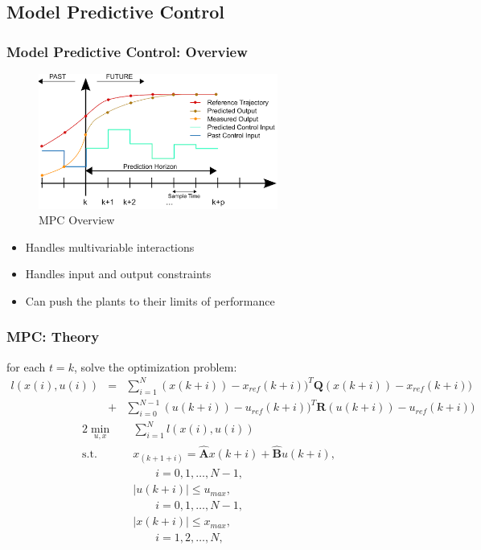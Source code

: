 \documentclass{beamer}
\begin{document}
\subsection{Model Predictive Control}
\begin{frame}
  \frametitle{Model Predictive Control: Overview}
  \begin{figure}
    \includegraphics[width = 0.7\textwidth]{fig/MPC.png}
    \caption{MPC Overview}
  \end{figure}
  \vspace{-0.5cm}
  \begin{itemize}
    \item Handles multivariable interactions
    \item Handles input and output constraints
    \item Can push the plants to their limits of performance
  \end{itemize}
\end{frame}

\begin{frame}
  \frametitle{MPC: Theory}
  for each $t = k$, solve the optimization problem: 
  \small
  \begin{eqnarray}
    l(x(i),u(i)) &=& \sum\limits_{i = 1}^N(x(k+i))-x_{ref}(k+i))^T\mathbf{Q}(x(k+i))-x_{ref}(k+i)) \nonumber \\
    &+&\sum\limits_{i = 0}^{N-1}(u(k+i))-u_{ref}(k+i))^T\mathbf{R}(u(k+i))-u_{ref}(k+i)) \nonumber
\end{eqnarray}
\vspace{-0.5cm}
\begin{alignat}{2}
    \min_{u,x} \quad &\sum\limits_{i=1}^N l(x(i),u(i)) \\
    \mbox{s.t.}\quad
    &x_{(k+1+i)}= \mathbf{\hat{A}}x(k+i) + \mathbf{\hat{B}}u(k+i), \nonumber\\
    &\quad \quad i=0,1,\dots,N-1,\label{con:model} \\
    &|u(k+i)| \leq u_{max}, \nonumber\\
    &\quad \quad i=0,1,\dots,N-1 \label{con:input}, \\
    &|x(k+i)| \leq x_{max}, \nonumber\label{con:state}\\
    &\quad \quad i=1,2,\dots,N,
\end{alignat}

\end{frame}
\end{document}
